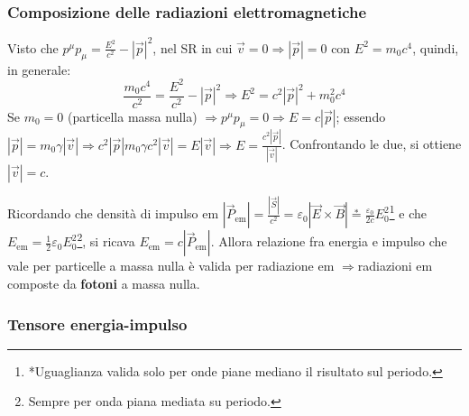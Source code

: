 \documentclass[a4paper]{scrartcl}
\numberwithin{equation}{subsection}
\theoremstyle{style1}
\begin{document}
\subsubsection{Composizione delle radiazioni elettromagnetiche}
Visto che $p^\mu  p_\mu  = \frac{E^2}{c^2}-\left\lvert \vec{p} \right\rvert ^2$, nel SR in cui $\vec{v}=0\Rightarrow \left\lvert \vec{p} \right\rvert =0 $ con $E ^2 = m_0c^4$, quindi, in generale:
\begin{equation}
	\frac{m_0 c^4}{c^2} = \frac{E^2}{c^2}-\left\lvert \vec{p} \right\rvert ^2 \Rightarrow E^2 = c^2 \left\lvert \vec{p} \right\rvert ^2 + m_0^2 c^4
\end{equation}
Se $m_0 =0 $ (particella massa nulla) $\Rightarrow p^\mu p_\mu = 0 \Rightarrow E = c\left\lvert \vec{p} \right\rvert$; essendo $\left\lvert \vec{p} \right\rvert= m_0\gamma \left\lvert \vec{v} \right\rvert \Rightarrow c^2 \left\lvert \vec{p} \right\rvert m_0\gamma c^2 \left\lvert \vec{v }  \right\rvert = E\left\lvert \vec{v} \right\rvert  \Rightarrow E = \frac{c^2 \left\lvert \vec{p} \right\rvert }{\left\lvert \vec{v} \right\rvert }$. Confrontando le due, si ottiene $\left\lvert \vec{v} \right\rvert =c$.

Ricordando che densit\`a di impulso em $\left\lvert \vec{P}_\text{em} \right\rvert = \frac{\left\lvert \vec{S} \right\rvert }{c^2}=\varepsilon _0 \left\lvert \vec{E}\times \vec{B} \right\rvert \stackrel{*}{=} \frac{\varepsilon _0}{2c}E_0^2$\footnote{*Uguaglianza valida solo per onde piane mediano il risultato sul periodo.}  e che $E_\text{em}=\frac{1}{2}\varepsilon _0 E_0^2$\footnote{Sempre per onda piana mediata su periodo.}, si ricava $E_\text{em}= c \left\lvert \vec{P}_\text{em} \right\rvert $. Allora relazione fra energia e impulso che vale per particelle a massa nulla \`e valida per radiazione em $\Rightarrow $radiazioni em composte da \textbf{fotoni} a massa nulla.

\subsubsection{Tensore energia-impulso}
\end{document}
